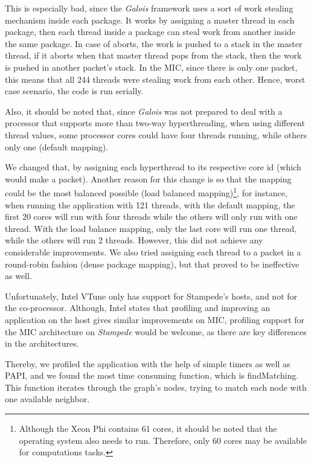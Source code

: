 \documentclass[abstract=on,9pt,twocolumn]{scrartcl}
\begin{document}
This is especially bad, since the \textit{Galois} framework uses a sort of work stealing mechanism inside each package. It works by assigning a master thread in each package, then each thread inside a package can steal work from another inside the same package. In case of aborts, the work is pushed to a stack in the master thread, if it aborts when that master thread pops from the stack, then the work is pushed in another packet's stack. In the MIC, since there is only one packet, this means that all 244 threads were stealing work from each other. Hence, worst case scenario, the code is run serially. 

Also, it should be noted that, since \textit{Galois} was not prepared to deal with a processor that supports more than two-way hyperthreading, when using different thread values, some processor cores could have four threads running, while others only one (default mapping).

We changed that, by assigning each hyperthread to its respective core id (which would make a packet).
Another reason for this change is so that the mapping could be
the most balanced possible (load balanced mapping)\footnote{Although the Xeon Phi contains 61 cores, it should be noted that the
operating system also needs to run. Therefore, only 60 cores may be
available for computations tasks.}, for instance,
when running the application with 121 threads, with the default mapping,
the first 20 cores will run with four threads while the others will only
run with one thread. With the load balance mapping, only the last core
will run one thread, while the others will run 2 threads. However, this did not achieve any considerable improvements. We also tried assigning each thread to a packet in a round-robin fashion (dense package mapping), but that proved to be ineffective as well.

Unfortunately, Intel VTune only has support for Stampede's hosts, and
not for the co-processor. Although, Intel states that profiling and
improving an application on the host gives similar improvements on MIC,
profiling support for the MIC architecture on \textit{Stampede} would be
welcome, as there are key differences in the architectures.

Thereby, we profiled the application with the help of simple timers as
well as PAPI, and we found the most time consuming function, which is
findMatching. This function iterates through the graph's nodes, trying
to match each node with one available neighbor.
\end{document}
